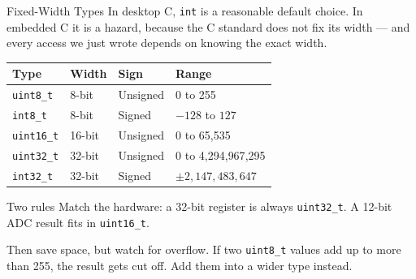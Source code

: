 \documentclass[9pt,aspectratio=169,xcolor=table]{beamer}
\begin{document}
\begin{frame}{Fixed-Width Types}
    \leavevmode
    {\small In desktop C, \texttt{int} is a reasonable default choice.
    In embedded C it is a \alert{hazard}, because the C standard does
    not fix its width --- and every access we just wrote depends on
    knowing the exact width.}

    \vspace{2mm}
    \begin{center}
    {\small
    \striped
    \begin{tabular}{@{}l l l l@{}}
        \toprule
        \textbf{Type} & \textbf{Width} & \textbf{Sign} & \textbf{Range} \\
        \midrule
        \texttt{uint8\_t}  & 8-bit  & Unsigned & 0 to 255 \\
        \texttt{int8\_t}   & 8-bit  & Signed   & $-128$ to $127$ \\
        \texttt{uint16\_t} & 16-bit & Unsigned & 0 to 65{,}535 \\
        \texttt{uint32\_t} & 32-bit & Unsigned & 0 to 4{,}294{,}967{,}295 \\
        \texttt{int32\_t}  & 32-bit & Signed   & $\pm 2{,}147{,}483{,}647$ \\
        \bottomrule
    \end{tabular}}
    \end{center}

    \vspace{2mm}
    \begin{block}{Two rules}
        \alert{Match the hardware}: a 32-bit register is always
        \texttt{uint32\_t}. A 12-bit ADC result fits in
        \texttt{uint16\_t}.

        \vspace{1mm}
        \alert{Then save space}, but watch for overflow. If two
        \texttt{uint8\_t} values add up to more than 255, the result
        gets cut off. Add them into a wider type instead.
    \end{block}
\end{frame}
\end{document}
